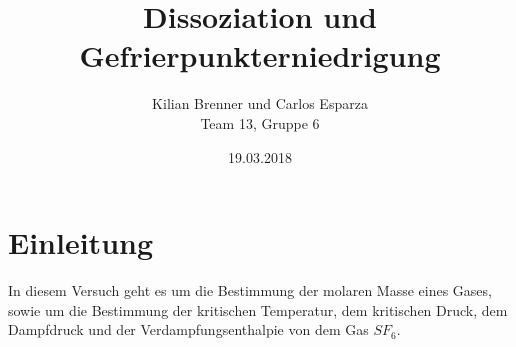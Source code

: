 \documentclass[12pt,a4paper]{article}
\title{Dissoziation und Gefrierpunkterniedrigung}
\author{Kilian Brenner und Carlos Esparza \\ Team 13, Gruppe 6}
\date{19.03.2018}
\begin{document}
\maketitle
\tableofcontents
\newpage

\section{Einleitung}
In diesem Versuch geht es um die Bestimmung der molaren Masse eines Gases, sowie um die Bestimmung der kritischen Temperatur, dem kritischen Druck, dem Dampfdruck und der Verdampfungsenthalpie von dem Gas $SF_6$.













\begin{appendix}

\end{appendix}
\end{document}
